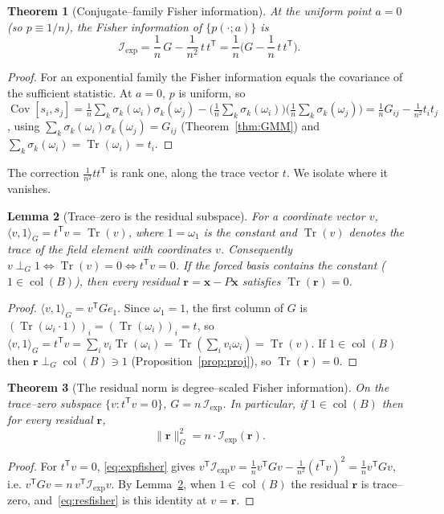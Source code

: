 \documentclass[11pt]{article}
\theoremstyle{plain}
\newtheorem{theorem}{Theorem}[section]
\newtheorem{lemma}[theorem]{Lemma}
\theoremstyle{definition}
\theoremstyle{remark}
\newcommand{\Tr}{\operatorname{Tr}}
\newcommand{\Fish}{\mathcal{I}}
\newcommand{\rr}{\mathbf{r}}
\newcommand{\xx}{\mathbf{x}}
\newcommand{\GG}{G}
\newcommand{\BB}{B}
\newcommand{\transpose}{^{\mathsf{T}}}
\DeclareMathOperator{\col}{col}
\DeclareMathOperator{\Cov}{Cov}
\begin{document}
\begin{theorem}[Conjugate--family Fisher information]\label{thm:expfisher}
At the uniform point $a=0$ (so $p\equiv 1/n$), the Fisher information of $\{p(\cdot;a)\}$ is
\begin{equation}\label{eq:expfisher}
  \Fish_{\mathrm{exp}}=\frac1n\,\GG-\frac1{n^2}\,t\,t\transpose=\frac1n\Big(\GG-\frac1n\,t\,t\transpose\Big).
\end{equation}
\end{theorem}
\begin{proof}
For an exponential family the Fisher information equals the covariance of the sufficient statistic. At
$a=0$, $p$ is uniform, so
$\Cov[s_i,s_j]=\tfrac1n\sum_k\sigma_k(\omega_i)\sigma_k(\omega_j)-\big(\tfrac1n\sum_k\sigma_k(\omega_i)\big)
\big(\tfrac1n\sum_k\sigma_k(\omega_j)\big)=\tfrac1n\GG_{ij}-\tfrac1{n^2}t_it_j$, using
$\sum_k\sigma_k(\omega_i)\sigma_k(\omega_j)=\GG_{ij}$ (Theorem~\ref{thm:GMM}) and
$\sum_k\sigma_k(\omega_i)=\Tr(\omega_i)=t_i$.
\end{proof}

The correction $\tfrac1{n^2}tt\transpose$ is rank one, along the trace vector $t$. We isolate where it
vanishes.

\begin{lemma}[Trace--zero is the residual subspace]\label{lem:tracezero}
For a coordinate vector $v$, $\langle v,1\rangle_{\GG}=t\transpose v=\Tr(v)$, where $1=\omega_1$ is the
constant and $\Tr(v)$ denotes the trace of the field element with coordinates $v$. Consequently
$v\perp_{\GG}1\iff \Tr(v)=0\iff t\transpose v=0$. If the forced basis contains the constant
($1\in\col(\BB)$), then every residual $\rr=\xx-P\xx$ satisfies $\Tr(\rr)=0$.
\end{lemma}
\begin{proof}
$\langle v,1\rangle_{\GG}=v\transpose\GG e_1$. Since $\omega_1=1$, the first column of $\GG$ is
$(\Tr(\omega_i\cdot 1))_i=(\Tr(\omega_i))_i=t$, so $\langle v,1\rangle_{\GG}=t\transpose v
=\sum_i v_i\Tr(\omega_i)=\Tr(\sum_i v_i\omega_i)=\Tr(v)$. If $1\in\col(\BB)$ then
$\rr\perp_{\GG}\col(\BB)\ni 1$ (Proposition~\ref{prop:proj}), so $\Tr(\rr)=0$.
\end{proof}

\begin{theorem}[The residual norm is degree--scaled Fisher information]\label{thm:resfisher}
On the trace--zero subspace $\{v:t\transpose v=0\}$, $\GG=n\,\Fish_{\mathrm{exp}}$. In particular, if
$1\in\col(\BB)$ then for every residual $\rr$,
\begin{equation}\label{eq:resfisher}
  \lVert\rr\rVert_{\GG}^2=n\cdot\Fish_{\mathrm{exp}}(\rr) .
\end{equation}
\end{theorem}
\begin{proof}
For $t\transpose v=0$, \eqref{eq:expfisher} gives
$v\transpose\Fish_{\mathrm{exp}}v=\tfrac1n v\transpose\GG v-\tfrac1{n^2}(t\transpose v)^2=\tfrac1n
v\transpose\GG v$, i.e. $v\transpose\GG v=n\,v\transpose\Fish_{\mathrm{exp}}v$. By Lemma~\ref{lem:tracezero},
when $1\in\col(\BB)$ the residual $\rr$ is trace--zero, and~\eqref{eq:resfisher} is this identity at
$v=\rr$.
\end{proof}
\end{document}
